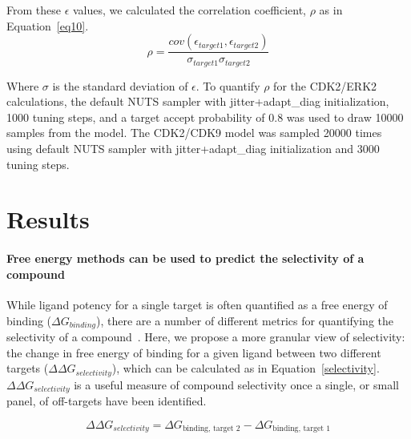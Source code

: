 \documentclass[9pt,lineno]{elife-modified} %
\begin{document}
From these $\epsilon$ values, we calculated the correlation coefficient, $\rho$ as in Equation~\ref{eq10}. 
\begin{equation}\label{eq10}
\rho = \frac{cov(\epsilon_{target1}, \epsilon_{target2})}{\sigma_{target 1}\sigma_{target 2}}
\end{equation}
 
 Where $\sigma$ is the standard deviation of $\epsilon$. To quantify $\rho$ for the CDK2/ERK2 calculations, the default NUTS sampler with jitter+adapt\_diag initialization, 1000 tuning steps, and a target accept probability of 0.8 was used to draw 10000 samples from the model. The CDK2/CDK9 model was sampled 20000 times using default NUTS sampler with jitter+adapt\_diag initialization and 3000 tuning steps. 
 
%
%
%

\section{Results}
\paragraph{Free energy methods can be used to predict the selectivity of a compound}
While ligand potency for a single target is often quantified as a free energy of binding ($\Delta G_{binding}$), there are a number of different metrics for quantifying the selectivity of a compound~\citep{Bosc:2017gs,Cheng2010-ip}. Here, we propose a more granular view of selectivity: the change in free energy of binding for a given ligand between two different targets ($\Delta \Delta G_{selectivity}$), which can be calculated as in Equation~\ref{selectivity}. $\Delta \Delta G_{selectivity}$ is a useful measure of compound selectivity once a single, or small panel, of off-targets have been identified. 

\begin{equation}\label{selectivity}
\Delta \Delta G_{selectivity} = \Delta G_{\text{binding, target 2}} - \Delta G_{\text{binding, target 1}}
\end{equation}
\end{document}

